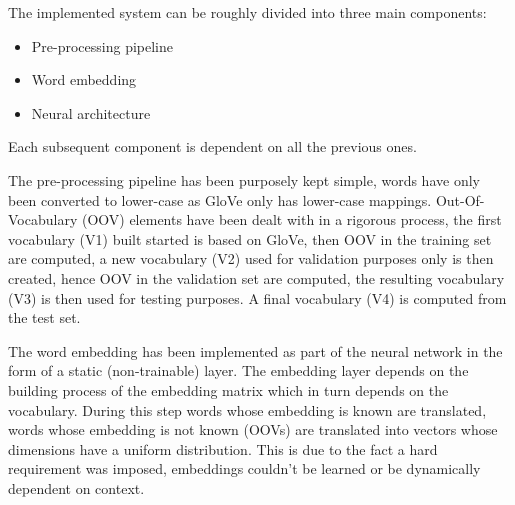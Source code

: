 \documentclass[11pt]{article}
\begin{document}

The implemented system can be roughly divided into three main components:
\begin{itemize}
\item Pre-processing pipeline
\item Word embedding
\item Neural architecture
\end{itemize}

Each subsequent component is dependent on all the previous ones.

The pre-processing pipeline has been purposely kept simple, words have only been converted to lower-case as GloVe\cite{Pennington2014} only has lower-case mappings. Out-Of-Vocabulary (OOV) elements have been dealt with in a rigorous process, the first vocabulary (V1) built started is based on GloVe, then OOV in the training set are computed, a new vocabulary (V2) used for validation purposes only is then created, hence OOV in the validation set are computed, the resulting vocabulary (V3) is then used for testing purposes. A final vocabulary (V4) is computed from the test set.

The word embedding has been implemented as part of the neural network in the form of a static (non-trainable) layer. The embedding layer depends on the building process of the embedding matrix which in turn depends on the vocabulary. During this step words whose embedding is known are translated, words whose embedding is not known (OOVs) are translated into vectors whose dimensions have a uniform distribution. This is due to the fact a hard requirement was imposed, embeddings couldn't be learned or be dynamically dependent on context.
\end{document}
